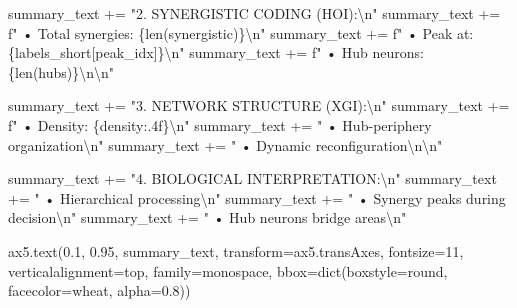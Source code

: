 \documentclass[
  11pt,
  letterpaper,
  oneside,
  openany]{book}
\newenvironment{Shaded}{\begin{snugshade}}{\end{snugshade}}
\newcommand{\BuiltInTok}[1]{\textcolor[rgb]{0.00,0.23,0.31}{#1}}
\newcommand{\CharTok}[1]{\textcolor[rgb]{0.13,0.47,0.30}{#1}}
\newcommand{\DecValTok}[1]{\textcolor[rgb]{0.68,0.00,0.00}{#1}}
\newcommand{\FloatTok}[1]{\textcolor[rgb]{0.68,0.00,0.00}{#1}}
\newcommand{\NormalTok}[1]{\textcolor[rgb]{0.00,0.23,0.31}{#1}}
\newcommand{\OperatorTok}[1]{\textcolor[rgb]{0.37,0.37,0.37}{#1}}
\newcommand{\SpecialCharTok}[1]{\textcolor[rgb]{0.37,0.37,0.37}{#1}}
\newcommand{\SpecialStringTok}[1]{\textcolor[rgb]{0.13,0.47,0.30}{#1}}
\newcommand{\StringTok}[1]{\textcolor[rgb]{0.13,0.47,0.30}{#1}}
\begin{document}
\begin{Shaded}
\begin{Highlighting}[]
\NormalTok{summary\_text }\OperatorTok{+=} \StringTok{"2. SYNERGISTIC CODING (HOI):}\CharTok{\textbackslash{}n}\StringTok{"}
\NormalTok{summary\_text }\OperatorTok{+=} \SpecialStringTok{f"   • Total synergies: }\SpecialCharTok{\{}\BuiltInTok{len}\NormalTok{(synergistic)}\SpecialCharTok{\}}\CharTok{\textbackslash{}n}\SpecialStringTok{"}
\NormalTok{summary\_text }\OperatorTok{+=} \SpecialStringTok{f"   • Peak at: }\SpecialCharTok{\{}\NormalTok{labels\_short[peak\_idx]}\SpecialCharTok{\}}\CharTok{\textbackslash{}n}\SpecialStringTok{"}
\NormalTok{summary\_text }\OperatorTok{+=} \SpecialStringTok{f"   • Hub neurons: }\SpecialCharTok{\{}\BuiltInTok{len}\NormalTok{(hubs)}\SpecialCharTok{\}}\CharTok{\textbackslash{}n\textbackslash{}n}\SpecialStringTok{"}

\NormalTok{summary\_text }\OperatorTok{+=} \StringTok{"3. NETWORK STRUCTURE (XGI):}\CharTok{\textbackslash{}n}\StringTok{"}
\NormalTok{summary\_text }\OperatorTok{+=} \SpecialStringTok{f"   • Density: }\SpecialCharTok{\{}\NormalTok{density}\SpecialCharTok{:.4f\}}\CharTok{\textbackslash{}n}\SpecialStringTok{"}
\NormalTok{summary\_text }\OperatorTok{+=} \StringTok{"   • Hub{-}periphery organization}\CharTok{\textbackslash{}n}\StringTok{"}
\NormalTok{summary\_text }\OperatorTok{+=} \StringTok{"   • Dynamic reconfiguration}\CharTok{\textbackslash{}n\textbackslash{}n}\StringTok{"}

\NormalTok{summary\_text }\OperatorTok{+=} \StringTok{"4. BIOLOGICAL INTERPRETATION:}\CharTok{\textbackslash{}n}\StringTok{"}
\NormalTok{summary\_text }\OperatorTok{+=} \StringTok{"   • Hierarchical processing}\CharTok{\textbackslash{}n}\StringTok{"}
\NormalTok{summary\_text }\OperatorTok{+=} \StringTok{"   • Synergy peaks during decision}\CharTok{\textbackslash{}n}\StringTok{"}
\NormalTok{summary\_text }\OperatorTok{+=} \StringTok{"   • Hub neurons bridge areas}\CharTok{\textbackslash{}n}\StringTok{"}

\NormalTok{ax5.text(}\FloatTok{0.1}\NormalTok{, }\FloatTok{0.95}\NormalTok{, summary\_text, transform}\OperatorTok{=}\NormalTok{ax5.transAxes,}
\NormalTok{        fontsize}\OperatorTok{=}\DecValTok{11}\NormalTok{, verticalalignment}\OperatorTok{=}\StringTok{\textquotesingle{}top\textquotesingle{}}\NormalTok{, family}\OperatorTok{=}\StringTok{\textquotesingle{}monospace\textquotesingle{}}\NormalTok{,}
\NormalTok{        bbox}\OperatorTok{=}\BuiltInTok{dict}\NormalTok{(boxstyle}\OperatorTok{=}\StringTok{\textquotesingle{}round\textquotesingle{}}\NormalTok{, facecolor}\OperatorTok{=}\StringTok{\textquotesingle{}wheat\textquotesingle{}}\NormalTok{, alpha}\OperatorTok{=}\FloatTok{0.8}\NormalTok{))}


\end{Highlighting}
\end{Shaded}
\end{document}
